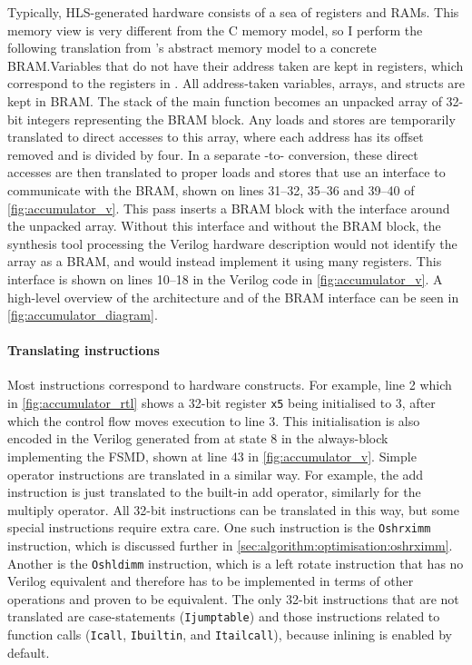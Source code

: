 Typically, HLS-generated hardware consists of a sea of registers and RAMs.  This
memory view is very different from the C memory model, so I perform the
following translation from \compcert{}'s abstract memory model to a concrete
\gls{BRAM}.\@ Variables that do not have their address taken are kept in
registers, which correspond to the registers in \rtl{}.  All address-taken
variables, arrays, and structs are kept in \gls{BRAM}.  The stack of the main
function becomes an unpacked array of 32-bit integers representing the
\gls{BRAM} block.  Any loads and stores are temporarily translated to direct
accesses to this array, where each address has its offset removed and is divided
by four.  In a separate \htl{}-to-\htl{} conversion, these direct accesses are
then translated to proper loads and stores that use an interface to communicate
with the \gls{BRAM}, shown on lines 31--32, 35--36 and 39--40 of
\cref{fig:accumulator_v}.  This pass inserts a \gls{BRAM} block with the
interface around the unpacked array.  Without this interface and without the
\gls{BRAM} block, the synthesis tool processing the Verilog hardware description
would not identify the array as a \gls{BRAM}, and would instead implement it
using many registers.  This interface is shown on lines 10--18 in the Verilog
code in \cref{fig:accumulator_v}.  A high-level overview of the architecture and
of the \gls{BRAM} interface can be seen in \cref{fig:accumulator_diagram}.

\paragraph{Translating instructions}

Most \rtl{} instructions correspond to hardware constructs.  For example, line 2
which in \cref{fig:accumulator_rtl} shows a 32-bit register \texttt{x5} being
initialised to 3, after which the control flow moves execution to line 3. This
initialisation is also encoded in the Verilog generated from \htl{} at state 8
in the always-block implementing the \gls{FSMD}, shown at line 43 in
\cref{fig:accumulator_v}.  Simple operator instructions are translated in a
similar way.  For example, the add instruction is just translated to the
built-in add operator, similarly for the multiply operator.  All 32-bit
instructions can be translated in this way, but some special instructions
require extra care. One such instruction is the \texttt{Oshrximm} instruction,
which is discussed further in
\cref{sec:algorithm:optimisation:oshrximm}. Another is the \texttt{Oshldimm}
instruction, which is a left rotate instruction that has no Verilog equivalent
and therefore has to be implemented in terms of other operations and proven to
be equivalent.  The only 32-bit instructions that are not translated are
case-statements (\texttt{Ijumptable}) and those instructions related to function
calls (\texttt{Icall}, \texttt{Ibuiltin}, and \texttt{Itailcall}), because
inlining is enabled by default.

